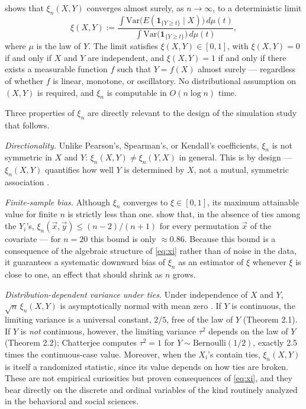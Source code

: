 \documentclass[article]{ajs}
\begin{document}
\cite{chatterjee2021} shows that $\xi_n(X,Y)$ converges almost surely,
as $n \to \infty$, to a deterministic limit
\begin{equation} \label{eq:xi-limit}
  \xi(X,Y) := \frac{\int \mathrm{Var}\big(E(\mathbf{1}_{\{Y \ge t\}} \mid X)\big)\, d\mu(t)}
                    {\int \mathrm{Var}\big(\mathbf{1}_{\{Y \ge t\}}\big)\, d\mu(t)},
\end{equation}
where $\mu$ is the law of $Y$. The limit satisfies $\xi(X,Y) \in
[0,1]$, with $\xi(X,Y) = 0$ if and only if $X$ and $Y$ are independent,
and $\xi(X,Y) = 1$ if and only if there exists a measurable function
$f$ such that $Y = f(X)$ almost surely --- regardless of whether $f$ is
linear, monotone, or oscillatory. No distributional assumption on
$(X,Y)$ is required, and $\xi_n$ is computable in $O(n \log n)$ time.

Three properties of $\xi_n$ are directly relevant to the design of the
simulation study that follows.

\emph{Directionality.} Unlike Pearson's, Spearman's, or Kendall's
coefficients, $\xi_n$ is not symmetric in $X$ and $Y$:
$\xi_n(X,Y) \ne \xi_n(Y,X)$ in general. This is by design ---
$\xi_n(X,Y)$ quantifies how well $Y$ is determined by $X$, not a
mutual, symmetric association \citep{chatterjee2021}.

\emph{Finite-sample bias.} Although $\xi_n$ converges to $\xi \in
[0,1]$, its maximum attainable value for finite $n$ is strictly less
than one. \cite{dalitz2024} show that, in the absence of ties among
the $Y_i$'s, $\xi_n(\vec x, \vec y) \le (n-2)/(n+1)$ for every
permutation $\vec x$ of the covariate --- for $n=20$ this bound is only
$\approx 0.86$. Because this bound is a consequence of the algebraic
structure of \eqref{eq:xi} rather than of noise in the data, it
guarantees a systematic downward bias of $\xi_n$ as an estimator of
$\xi$ whenever $\xi$ is close to one, an effect that should shrink as
$n$ grows.

\emph{Distribution-dependent variance under ties.} Under independence
of $X$ and $Y$, $\sqrt{n}\,\xi_n(X,Y)$ is asymptotically normal with
mean zero \citep{chatterjee2021}. If $Y$ is continuous, the limiting
variance is a universal constant, $2/5$, free of the law of $Y$
(Theorem 2.1). If $Y$ is \emph{not} continuous, however, the limiting
variance $\tau^2$ depends on the law of $Y$ (Theorem 2.2); Chatterjee
computes $\tau^2 = 1$ for $Y \sim \mathrm{Bernoulli}(1/2)$, exactly 2.5
times the continuous-case value. Moreover, when the $X_i$'s contain
ties, $\xi_n(X,Y)$ is itself a randomized statistic, since its value
depends on how ties are broken. These are not empirical curiosities but
proven consequences of \eqref{eq:xi}, and they bear directly on the
discrete and ordinal variables of the kind routinely analyzed in the
behavioral and social sciences.
\end{document}
